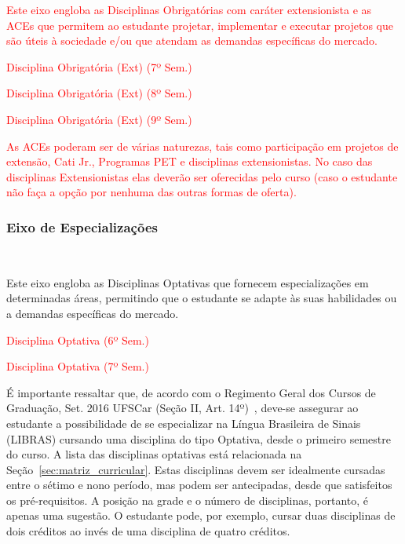 \textcolor{red}{Este eixo engloba as Disciplinas Obrigatórias com caráter extensionista e as ACEs que permitem ao estudante projetar, implementar e executar projetos que são úteis à sociedade e/ou que atendam as demandas específicas do mercado.}

\textcolor{red}{\begin{compenum}
    \item Disciplina Obrigatória (Ext) (7º Sem.)
    \item Disciplina Obrigatória (Ext) (8º Sem.)
    \item Disciplina Obrigatória (Ext) (9º Sem.)
\end{compenum}}

\textcolor{red}{As ACEs poderam ser de várias naturezas, tais como participação em projetos de extensão, Cati Jr., Programas PET e disciplinas extensionistas. No caso das disciplinas Extensionistas elas deverão ser oferecidas pelo curso (caso o estudante não faça a opção por nenhuma das outras formas de oferta).}

\subsubsection{Eixo de Especializações }~\label{sec:E9}

Este eixo engloba as Disciplinas Optativas que fornecem especializações em determinadas áreas, permitindo que o estudante se adapte às suas habilidades ou a demandas específicas do mercado.

\textcolor{red}{\begin{compenum}
    \item Disciplina Optativa (6º Sem.)
    \item Disciplina Optativa (7º Sem.)
\end{compenum}}

É importante ressaltar que, de acordo com o Regimento Geral dos Cursos de Graduação, Set. 2016 UFSCar (Seção II, Art. 14º)~\cite{RGCG}, deve-se assegurar ao estudante a possibilidade de se especializar na Língua Brasileira de Sinais (LIBRAS) cursando uma disciplina do tipo Optativa, desde o primeiro semestre do curso. A lista das disciplinas optativas está relacionada na Seção~\ref{sec:matriz_curricular}. Estas disciplinas devem ser idealmente cursadas entre o sétimo e nono período, mas podem ser antecipadas, desde que satisfeitos os pré-requisitos. A posição na grade e o número de disciplinas, portanto, é apenas uma sugestão. O estudante pode, por exemplo, cursar duas disciplinas de dois créditos ao invés de uma disciplina de quatro créditos.%


